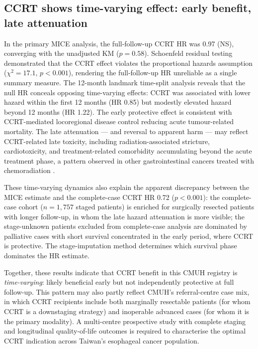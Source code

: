 \documentclass[12pt,a4paper]{article}
\begin{document}
\subsection{CCRT shows time-varying effect: early benefit, late attenuation}
In the primary MICE analysis, the full-follow-up CCRT HR was 0.97 (NS),
converging with the unadjusted KM ($p = 0.58$). Schoenfeld residual
testing demonstrated that the CCRT effect violates the proportional
hazards assumption ($\chi^2 = 17.1$, $p < 0.001$), rendering the
full-follow-up HR unreliable as a single summary measure. The 12-month
landmark time-split analysis reveals that the null HR conceals opposing
time-varying effects: CCRT was associated with lower hazard within the
first 12 months (HR 0.85) but modestly elevated hazard beyond 12 months
(HR 1.22). The early protective effect is consistent with CCRT-mediated
locoregional disease control reducing acute tumour-related mortality.
The late attenuation --- and reversal to apparent harm --- may reflect
CCRT-related late toxicity, including radiation-associated stricture,
cardiotoxicity, and treatment-related comorbidity accumulating beyond
the acute treatment phase, a pattern observed in other gastrointestinal
cancers treated with chemoradiation \cite{vanHagen2012}.

These time-varying dynamics also explain the apparent discrepancy between
the MICE estimate and the complete-case CCRT HR 0.72 ($p < 0.001$):
the complete-case cohort ($n = 1{,}757$ staged patients) is enriched for
surgically resected patients with longer follow-up, in whom the late
hazard attenuation is more visible; the stage-unknown patients excluded
from complete-case analysis are dominated by palliative cases with
short survival concentrated in the early period, where CCRT is
protective. The stage-imputation method determines which survival phase
dominates the HR estimate.

Together, these results indicate that CCRT benefit in this CMUH registry is
\textit{time-varying}: likely beneficial early but not independently
protective at full follow-up. This pattern may also partly reflect
CMUH's referral-centre case mix, in which CCRT recipients include both
marginally resectable patients (for whom CCRT is a downstaging strategy)
and inoperable advanced cases (for whom it is the primary modality). A
multi-centre prospective study with complete staging and longitudinal
quality-of-life outcomes is required to characterise the optimal CCRT
indication across Taiwan's esophageal cancer population.
\end{document}
